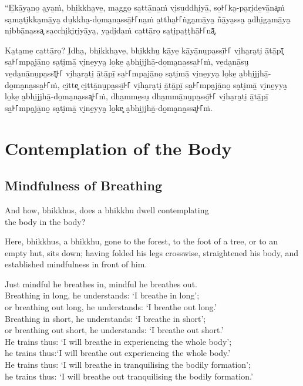 “E̱kā̱ya̮no̱ a̮ya̱ṁ, bhi̱kkha̮ve̱, ma̱ggo̱ sa̱ttā̱na̱ṁ vi̮su̱ddhi̮yā̱, so̱꜔꜒ka̮-pa̮ri̮de̱vā̱na͓ṁ
sa̮ma̮ti̱kka̮mā̱ya̮ du̱kkha̮-do̱ma̮na̱ssā̱꜔꜒na̱ṁ a̱ttha̱꜔꜒ṅga̮mā̱ya̮ ñā̱ya̱ssa̮ a̮dhi̮ga̮mā̱ya̮ ni̱bbā̱na̱ssa͓
sa̱cchi̮ki̮ri̮yā̱ya̮, ya̮di̮da̱ṁ ca̱ttā̱ro̱ sa̮ti̮pa̱ṭṭhā̱꜔꜒nā͓.

Ka̮ta̮me̱ ca̱ttā̱ro̱? I̮dha̮, bhi̱kkha̮ve̱, bhi̱kkhu̮ kā̱ye̱ kā̱yā̱nu̮pa̱ssī̱꜔꜒ vi̮ha̮ra̮ti̮ ā̱tā̱pī͓
sa̱꜔꜒mpa̮jā̱no̱ sa̮ti̮mā̱ vi̮ne̱yya̮ lo̱ke̱ a̮bhi̱jjhā̱-do̱ma̮na̱ssa̱꜔꜒ṁ, ve̱da̮nā̱su̮ ve̱da̮nā̱nu̮pa̱ssī͓꜔꜒
vi̮ha̮ra̮ti̮ ā̱tā̱pī̱ sa̱꜔꜒mpa̮jā̱no̱ sa̮ti̮mā̱ vi̮ne̱yya̮ lo̱ke̱ a̮bhi̱jjhā̱-do̱ma̮na̱ssa̱꜔꜒ṁ, ci̱tte͓
ci̱ttā̱nu̮pa̱ssī̱꜔꜒ vi̮ha̮ra̮ti̮ ā̱tā̱pī̱ sa̱꜔꜒mpa̮jā̱no̱ sa̮ti̮mā̱ vi̮ne̱yya̮ lo̱ke̱ a̮bhi̱jjhā̱-do̱ma̮na̱ssa͓꜔꜒ṁ,
dha̱mme̱su̮ dha̱mmā̱nu̮pa̱ssī̱꜔꜒ vi̮ha̮ra̮ti̮ ā̱tā̱pī̱ sa̱꜔꜒mpa̮jā̱no̱ sa̮ti̮mā̱ vi̮ne̱yya̮ lo̱ke͓
a̮bhi̱jjhā̱-do̱ma̮na̱ssa͓꜔꜒ṁ.


\englishPage
\chapter{Contemplation of the Body}

\section{Mindfulness of Breathing}

And how, bhikkhus, does a bhikkhu dwell contemplating\\
the body in the body?

Here, bhikkhus, a bhikkhu, gone to the forest, to the foot of a tree, or to an
empty hut, sits down; having folded his legs crosswise, straightened his body,
and established mindfulness in front of him.

Just mindful he breathes in, mindful he breathes out.\\
Breathing in long, he understands: ‘I breathe in long’;\\
or breathing out long, he understands: ‘I breathe out long.’\\
Breathing in short, he understands: ‘I breathe in short’;\\
or breathing out short, he understands: ‘I breathe out short.’\\
He trains thus: ‘I will breathe in experiencing the whole body’;\\
he trains thus:‘I will breathe out experiencing the whole body.’\\
He trains thus: ‘I will breathe in tranquilising the bodily formation’;\\
he trains thus: ‘I will breathe out tranquilising the bodily formation.’

